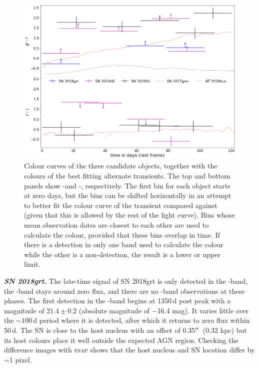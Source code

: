 \documentclass[a4paper,oneside,12pt, class=Latex/Classes/PhDthesisPSnPDF, crop=false]{standalone}
\begin{document}
\begin{figure}
 \centering
 \includegraphics[width=13cm]{../Images/chapter_3/candid_colours.png}
 \caption{Colour curves of the three candidate objects, together with the colours of the best fitting alternate transients. The top and bottom panels show \ztfg-\ztfr and \ztfr-\ztfi, respectively. The first bin for each object starts at zero days, but the bins can be shifted horizontally in an attempt to better fit the colour curve of the transient compared against (given that this is allowed by the rest of the light curve). Bins whose mean observation dates are closest to each other are used to calculate the colour, provided that these bins overlap in time. If there is a detection in only one band used to calculate the colour while the other is a non-detection, the result is a lower or upper limit.}
 \label{candidate_colours}
\end{figure}

\textit{\textbf{SN 2018grt.}}
The late-time signal of SN 2018grt is only detected in the \ztfr-band, the \ztfg-band stays around zero flux, and there are no \ztfi-band observations at these phases. The first detection in the \ztfr-band begins at 1350\,d post peak with a magnitude of $21.4\pm0.2$ (absolute magnitude of $-$16.4 mag). It varies little over the $\sim 100$\,d period where it is detected, after which it returns to zero flux within 50\,d. The SN is close to the host nucleus with an offset of 0.35$^{\prime\prime}$~(0.32 kpc) but its host colours place it well outside the expected AGN region. Checking the difference images with \textsc{snap} shows that the host nucleus and SN location differ by $\sim$1 pixel. 
\end{document}
